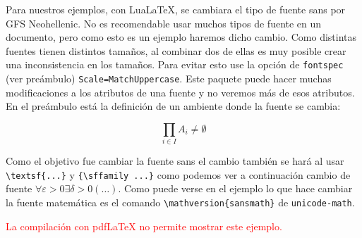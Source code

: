 Para nuestros ejemplos, con Lua\LaTeX, se cambiara el tipo de fuente sans
por GFS Neohellenic. No es recomendable usar muchos tipos de fuente en un
documento, pero como esto es un ejemplo haremos dicho cambio. Como distintas
fuentes tienen distintos tamaños, al combinar dos de ellas es muy posible
crear una inconsistencia en los tamaños. Para evitar esto use la opción de
\texttt{fontspec} (ver preámbulo) \texttt{Scale=MatchUppercase}. Este
paquete puede hacer muchas modificaciones a los atributos de una fuente y no
veremos más de esos atributos. En el preámbulo está la definición de un
ambiente donde la fuente se cambia:
\ifluatex%
\begin{sans}%
\label{textosans}
  \lipsum[1][1-3]
  \[
    \prod_{i\in I}A_i\ne\emptyset
  \]
\end{sans}
Como el objetivo fue cambiar la fuente sans el cambio también se hará al usar
\verb|\textsf{...}| y \verb|{\sffamily ...}| como podemos ver a continuación
\textsf{cambio de fuente
\(\forall\varepsilon>0\exists\delta>0(\ldots)\)}. Como
puede verse en el ejemplo lo que hace cambiar la fuente matemática es el
comando \verb|\mathversion{sansmath}| de \texttt{unicode-math}.
\else
\ifpdftex%
\begin{center}
\textcolor{red}{La compilación con pdf\LaTeX{} no permite mostrar este
ejemplo.}
\end{center}
\fi
\fi

